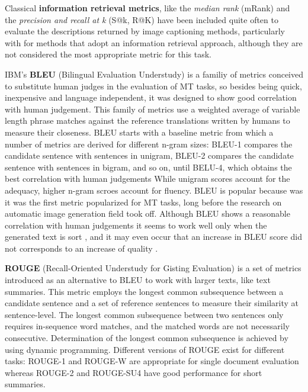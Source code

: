 Classical \textbf{information retrieval metrics}, like the \textit{median rank} (mRank) and the \textit{precision and recall at k} (S@k, R@K) have been included quite often to evaluate the descriptions returned by image captioning methods, particularly with for methods that adopt an information retrieval approach, although they are not considered the most appropriate metric for this task.

IBM's \textbf{BLEU} (Bilingual Evaluation Understudy) \citep{Papineni2002} is a familiy of metrics conceived to substitute human judges in the evaluation of MT tasks, so besides being quick, inexpensive and language independent, it was designed to show good correlation with human judgement. This family of metrics use a weighted average of variable length phrase matches against the reference translations written by humans to measure their closeness. BLEU starts with a baseline metric from which a number of metrics are derived for different n-gram sizes: BLEU-1 compares the candidate sentence with sentences in unigram, BLEU-2 compares the candidate sentence with sentences in bigram, and so on, until BELU-4, which obtains the best correlation with human judgements While unigram scores account for the adequacy, higher n-gram scroes account for fluency. BLEU is popular because was it was the first metric popularized for MT tasks, long before the research on automatic image generation field took off. Although BLEU shows a reasonable correlation with human judgements it seems to work well only when the generated text is sort  \citep{Callison-Burch2006}, and it may even occur that an increase in BLEU score did not corresponds to an increase of quality \citep{Lin2004b}.

\textbf{ROUGE} (Recall-Oriented Understudy for Gisting Evaluation) \citep{Lin2004a} is a set of metrics introduced as an alternative to BLEU to work with larger texts, like text summaries. This metric employs the longest common subsequence between a candidate sentence and a set of reference sentences to measure their similarity at sentence-level. The longest common subsequence between two sentences only requires in-sequence word matches, and the matched words are not necessarily consecutive. Determination of the longest common subsequence is achieved by using dynamic programming. Different versions of ROUGE exist for different tasks: ROUGE-1 and ROUGE-W are appropriate for single document evaluation whereas ROUGE-2 and ROUGE-SU4 have good performance for short summaries. 

